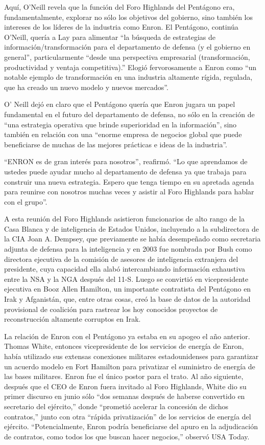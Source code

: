 \documentclass[10pt,a5paper,twoside,spanish,]{book}
\begin{document}
Aquí, O'Neill revela que la función del Foro Highlands del Pentágono
era, fundamentalmente, explorar no sólo los objetivos del gobierno, sino
también los intereses de los líderes de la industria como Enron. El
Pentágono, continúa O'Neill, quería a Lay para alimentar ``la búsqueda
de estrategias de información/transformación para el departamento de
defensa (y el gobierno en general'', particularmente ``desde una
perspectiva empresarial (transformación, productividad y ventaja
competitiva).'' Elogió fervorosamente a Enron como ``un notable ejemplo
de transformación en una industria altamente rígida, regulada, que ha
creado un nuevo modelo y nuevos mercados''.

O' Neill dejó en claro que el Pentágono quería que Enron jugara un papel
fundamental en el futuro del departamento de defensa, no sólo en la
creación de ``una estrategia operativa que brinde superioridad en la
información'', sino también en relación con una ``enorme empresa de
negocios global que puede beneficiarse de muchas de las mejores
prácticas e ideas de la industria''.

``ENRON es de gran interés para nosotros'', reafirmó. ``Lo que
aprendamos de ustedes puede ayudar mucho al departamento de defensa ya
que trabaja para construir una nueva estrategia. Espero que tenga tiempo
en su apretada agenda para reunirse con nosotros muchas veces y asistir
al Foro Highlands para hablar con el grupo''.

A esta reunión del Foro Highlands asistieron funcionarios de alto rango
de la Casa Blanca y de inteligencia de Estados Unidos, incluyendo a la
subdirectora de la CIA Joan A. Dempsey, que previamente se había
desempeñado como secretaria adjunta de defensa para la inteligencia y en
2003 fue nombrada por Bush como directora ejecutiva de la comisión de
asesores de inteligencia extranjera del presidente, cuya capacidad ella
alabó intercambiando información exhaustiva entre la NSA y la NGA
después del 11-S. Luego se convirtió en vicepresidente ejecutiva en Booz
Allen Hamilton, un importante contratista del Pentágono en Irak y
Afganistán, que, entre otras cosas, creó la base de datos de la
autoridad provisional de coalición para rastrear los hoy conocidos
proyectos de reconstrucción altamente corruptos en Irak.

La relación de Enron con el Pentágono ya estaba en su apogeo el año
anterior. Thomas White, entonces vicepresidente de los servicios de
energía de Enron, había utilizado sus extensas conexiones militares
estadounidenses para garantizar un acuerdo modelo en Fort Hamilton para
privatizar el suministro de energía de las bases militares. Enron fue el
único postor para el trato. Al año siguiente, después que el CEO de
Enron fuera invitado al Foro Highlands, White dio su primer discurso en
junio sólo ``dos semanas después de haberse convertido en secretario del
ejército,'' donde ``prometió acelerar la concesión de dichos
contratos,'' junto con otra ``rápida privatización'' de los servicios de
energía del ejército. ``Potencialmente, Enron podría beneficiarse del
apuro en la adjudicación de contratos, como todos los que buscan hacer
negocios,'' observó USA Today.
\end{document}
